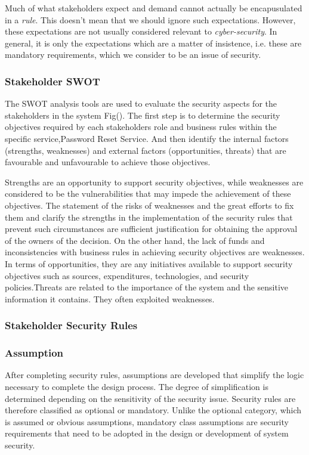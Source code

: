 Much of what stakeholders expect and demand cannot actually be encapusulated in a {\em rule}.
This doesn't mean that we should ignore such expectations. However, these expectations
are not usually considered relevant to {\em cyber-security}. In general, it is only
the expectations which are a matter of insistence, i.e. these are mandatory requirements,
which we consider to be an issue of security.


\iffalse
\subsubsection{Stakeholder SWOT}\label{stswot}
The SWOT analysis tools are used to evaluate the security aspects for the stakeholders in the system Fig(). The first step is to determine the security objectives required by each stakeholders role and business rules within the specific service,Password Reset Service. And then identify the internal factors (strengths, weaknesses) and external factors (opportunities, threats) that are favourable and unfavourable to achieve those objectives.

Strengths are an opportunity to support security objectives, while weaknesses are considered to be the vulnerabilities that may impede the achievement of these objectives. The statement of the risks of weaknesses and the great efforts to fix them and clarify the strengths in the implementation of the security rules that prevent such circumstances are sufficient justification for obtaining the approval of the owners of the decision. On the other hand, the lack of funds and inconsistencies with business rules in achieving security objectives are weaknesses. In terms of opportunities, they are any initiatives available to support security objectives such as sources, expenditures, technologies, and security policies.Threats are related to the importance of the system and the sensitive information it contains. They often exploited weaknesses.


\subsubsection{Stakeholder Security Rules}\label{stsecrul}
\subsubsection{Assumption}\label{assmp} 
After completing security rules, assumptions are developed that simplify the logic necessary to complete the design process. The degree of simplification is determined depending on the sensitivity of the security issue. Security rules are therefore classified as optional or mandatory. Unlike the optional category, which is assumed or obvious assumptions, mandatory class assumptions are security requirements that need to be adopted in the design or development of system security.
